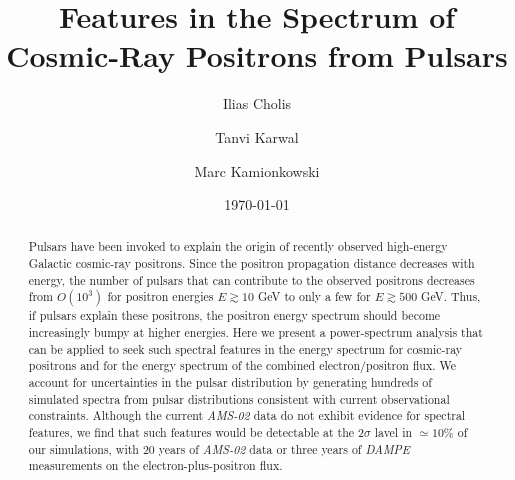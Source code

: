\documentclass[aps,prd,twocolumn,amsmath,superscriptaddress,amssymb,showpacs,floatfix,nofootinbib]{revtex4-1}
\begin{document}
\title{Features in the Spectrum of Cosmic-Ray Positrons from Pulsars}

\author{Ilias Cholis}
\author{Tanvi Karwal}
\author{Marc Kamionkowski}

\date{\today}






\begin{abstract}
Pulsars have been invoked to explain the origin of recently
observed high-energy Galactic cosmic-ray positrons.  Since the
positron propagation distance decreases with energy, the number of
pulsars that can contribute to the observed positrons decreases
from $O(10^3)$ for positron energies $E\gtrsim10$ GeV to only a
few for $E \gtrsim 500$ GeV.  Thus, if pulsars explain these
positrons, the positron energy spectrum should become
increasingly bumpy at higher energies.  Here we present a
power-spectrum analysis that can be applied to seek such
spectral features in the energy spectrum for cosmic-ray
positrons and for the energy spectrum of the combined
electron/positron flux.  We account for uncertainties in the
pulsar distribution by generating hundreds of simulated spectra
from pulsar distributions consistent with current observational
constraints.  Although the current \textit{AMS-02} data do not
exhibit evidence for spectral features, we find that such
features would be detectable at the 2$\sigma$ lavel in $\simeq 10\%$
 of our simulations, with 20 years of \textit{AMS-02} data or three 
 years of \textit{DAMPE} measurements on the 
electron-plus-positron flux.
\end{abstract}


\maketitle

\end{document}
